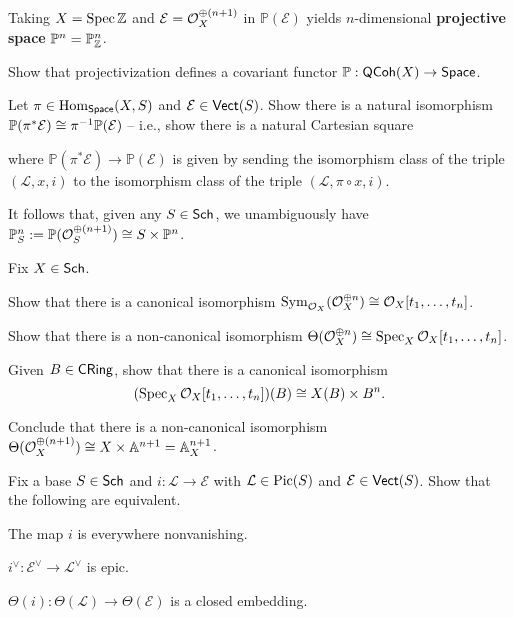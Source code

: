 \documentclass[11pt]{article}
\newcommand{\EE}{\mathcal{E}}
\renewcommand{\L}{\mathcal{L}}
\renewcommand{\P}{\mathbb{P}}
\begin{document}
\begin{example}
Taking $X=\operatorname{Spec}\mathbb{Z}$ and $\EE=\O_X^{\oplus(n+1)}$ in $\P(\EE)$ yields $n$-dimensional \textbf{projective space} $\P^n=\P_{\Z}^n$.
\end{example}

\begin{exercise}
Show that projectivization defines a covariant functor $\P: \QCoh(X)\to\Space$.
\end{exercise}

\begin{exercise}
Let $\pi\in\operatorname{Hom}_{\operatorname{\mathsf{Space}}}(X,S)$ and $\EE\in\Vect(S)$. Show there is a natural isomorphism $\P(\pi^*\EE)\iso\pi^{-1}\P(\EE)$ -- i.e., show there is a natural Cartesian square
\begin{center}
\end{center}
where $\P(\pi^*\EE)\to\P(\EE)$ is given by sending the isomorphism class of the triple $(\L,x,i)$ to the isomorphism class of the triple $(\L,\pi\circ x,i)$.
\end{exercise}

It follows that, given any $S\in\operatorname{\mathsf{Sch}}$, we unambiguously have $\P_S^n:=\P(\O_S^{\oplus(n+1)})\iso S\times\P^n$.

\begin{exercise}
Fix $X\in\operatorname{\mathsf{Sch}}$.
\begin{enum}{\alph}
\item Show that there is a canonical isomorphism $\operatorname{Sym}_{\mathcal{O}_X}(\mathcal{O}_X^{\oplus n})\cong\mathcal{O}_X[t_1,\ldots,t_n]$.

\item Show that there is a non-canonical isomorphism $\Theta(\mathcal{O}_X^{\oplus n})\cong\operatorname{Spec}_X\mathcal{O}_X[t_1,\ldots,t_n]$.

\item Given $B\in\operatorname{\mathsf{CRing}}$, show that there is a canonical isomorphism 
$$(\operatorname{Spec}_X\mathcal{O}_X[t_1,\ldots,t_n])(B)\cong X(B)\times B^n.$$

\item Conclude that there is a non-canonical isomorphism $\Theta(\mathcal{O}_X^{\oplus(n+1)})\cong X\times\mathbb{A}^{n+1}=\mathbb{A}_X^{n+1}$.
\end{enum}
\end{exercise}

\begin{exercise}
Fix a base $S\in\operatorname{\mathsf{Sch}}$ and $i: \L\to\EE$ with $\L\in\Pic(S)$ and $\EE\in\Vect(S)$. Show that the following are equivalent.
\begin{enum}{\roman}
\item The map $i$ is everywhere nonvanishing.

\item $i^{\vee}: \EE^{\vee}\to\L^{\vee}$ is epic.

\item $\Theta(i): \Theta(\L)\to\Theta(\EE)$ is a closed embedding.
\end{enum}
\end{exercise}
\end{document}
